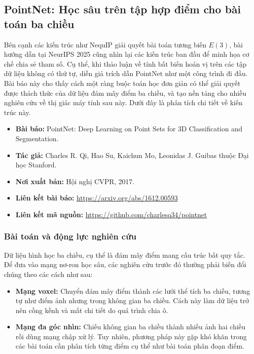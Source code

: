 \subsection{PointNet: Học sâu trên tập hợp điểm cho bài toán ba chiều}
\label{sec:pointnet-paper}

Bên cạnh các kiến trúc như NequIP giải quyết bài toán tương biến $E(3)$, bài hướng dẫn tại NeurIPS 2025 cũng nhìn lại các kiến trúc ban đầu để minh họa cơ chế chia sẻ tham số. Cụ thể, khi thảo luận về tính bất biến hoán vị trên các tập dữ liệu không có thứ tự, diễn giả trích dẫn PointNet như một công trình đi đầu. Bài báo này cho thấy cách một ràng buộc toán học đơn giản có thể giải quyết được thách thức của dữ liệu đám mây điểm ba chiều, và tạo nền tảng cho nhiều nghiên cứu về thị giác máy tính sau này. Dưới đây là phân tích chi tiết về kiến trúc này.

\begin{itemize}
    \item \textbf{Bài báo:} PointNet: Deep Learning on Point Sets for 3D Classification and Segmentation.
    \item \textbf{Tác giả:} Charles R. Qi, Hao Su, Kaichun Mo, Leonidas J. Guibas thuộc Đại học Stanford.
    \item \textbf{Nơi xuất bản:} Hội nghị CVPR, 2017.
    \item \textbf{Liên kết bài báo:} \url{https://arxiv.org/abs/1612.00593}
    \item \textbf{Liên kết mã nguồn:} \url{https://github.com/charlesq34/pointnet}
\end{itemize}

\subsubsection{Bài toán và động lực nghiên cứu}

Dữ liệu hình học ba chiều, cụ thể là đám mây điểm mang cấu trúc bất quy tắc. Để đưa vào mạng nơ-ron học sâu, các nghiên cứu trước đó thường phải biến đổi chúng theo các cách như sau:

\begin{itemize}
    \item \textbf{Mạng voxel:} Chuyển đám mây điểm thành các lưới thể tích ba chiều, tương tự như điểm ảnh nhưng trong không gian ba chiều. Cách này làm dữ liệu trở nên cồng kềnh và mất chi tiết do quá trình chia ô.
    \item \textbf{Mạng đa góc nhìn:} Chiếu không gian ba chiều thành nhiều ảnh hai chiều rồi dùng mạng chập xử lý. Tuy nhiên, phương pháp này gặp khó khăn trong các bài toán cần phân tích từng điểm cụ thể như bài toán phân đoạn điểm.
\end{itemize}

